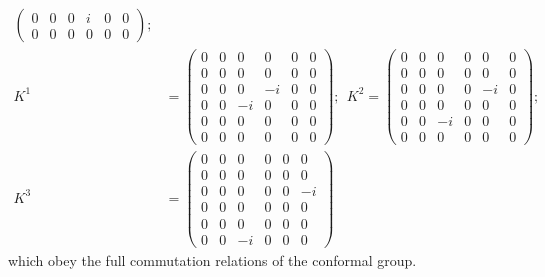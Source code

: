 \documentclass[aps,reprint,notitlepage,nofootinbib,superscriptaddress]{revtex4-1}
\begin{document}
\begin{align}
\begin{pmatrix}
  0&0&0&i & 0 & 0\\
  0&0&0&0 & 0 & 0
\end{pmatrix};\nonumber\\
K^1&=\begin{pmatrix}
    0&0&0&0&0&0\\
    0&0&0&0&0&0\\
    0&0&0&-i&0&0\\
  0&0&-i&0 & 0 & 0\\
  0&0&0&0 & 0 & 0\\
  0&0&0&0 & 0 & 0
\end{pmatrix};~~K^2=\begin{pmatrix}
    0&0&0&0&0&0\\
    0&0&0&0&0&0\\
    0&0&0&0&-i&0\\
  0&0&0&0 & 0 & 0\\
  0&0&-i&0 & 0 & 0\\
  0&0&0&0 & 0 & 0
\end{pmatrix};~~\nonumber\\
K^3&=\begin{pmatrix}
    0&0&0&0&0&0\\
    0&0&0&0&0&0\\
    0&0&0&0&0&-i\\
  0&0&0&0 & 0 & 0\\
  0&0&0&0 & 0 & 0\\
  0&0&-i&0 & 0 & 0
\end{pmatrix}
\end{align}
which obey the full commutation relations of the conformal group.
\end{document}
